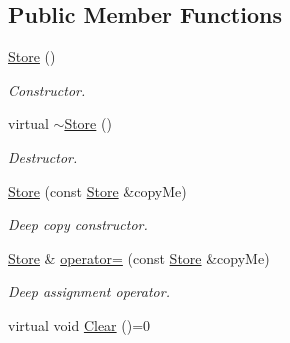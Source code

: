 \subsection*{Public Member Functions}
\begin{DoxyCompactItemize}
\item 
\hypertarget{class_store_a3966b60e25e5b867c66f49059a20ff2a}{
\hyperlink{class_store_a3966b60e25e5b867c66f49059a20ff2a}{Store} ()}
\label{class_store_a3966b60e25e5b867c66f49059a20ff2a}

\begin{DoxyCompactList}\small\item\em Constructor. \item\end{DoxyCompactList}\item 
\hypertarget{class_store_aa47f74ca4c6172eb748b8ddd85557ca0}{
virtual \hyperlink{class_store_aa47f74ca4c6172eb748b8ddd85557ca0}{$\sim$Store} ()}
\label{class_store_aa47f74ca4c6172eb748b8ddd85557ca0}

\begin{DoxyCompactList}\small\item\em Destructor. \item\end{DoxyCompactList}\item 
\hyperlink{class_store_a803e16a0fc3fa45717a4d949cf036414}{Store} (const \hyperlink{class_store}{Store} \&copyMe)
\begin{DoxyCompactList}\small\item\em Deep copy constructor. \item\end{DoxyCompactList}\item 
\hyperlink{class_store}{Store} \& \hyperlink{class_store_adb6f52d7984903ab1376049e515fb2c3}{operator=} (const \hyperlink{class_store}{Store} \&copyMe)
\begin{DoxyCompactList}\small\item\em Deep assignment operator. \item\end{DoxyCompactList}\item 
\hypertarget{class_store_a5b636444da803d93dabf5f42ce6afdad}{
virtual void \hyperlink{class_store_a5b636444da803d93dabf5f42ce6afdad}{Clear} ()=0}
\label{class_store_a5b636444da803d93dabf5f42ce6afdad}


\end{DoxyCompactItemize}
